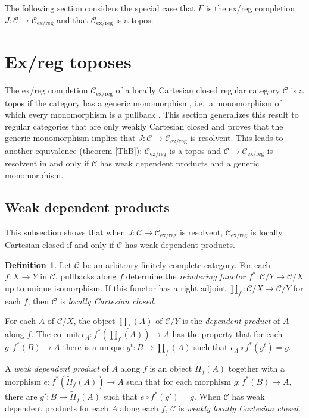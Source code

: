 \documentclass[sort&compress]{elsarticle}
\theoremstyle{plain}
\theoremstyle{definition}
\newtheorem{defin}[theorem]{Definition}
\theoremstyle{remark}
\newcommand\cat\mathcal
\newcommand\exreg{_\mathrm{ex/reg}}
\begin{document}
The following section considers the special case that $F$ is the ex/reg completion $J:\cat C\to\cat C\exreg$ and that $\cat C\exreg$ is a topos.

\section{Ex/reg toposes}
The ex/reg completion $\cat C\exreg$ of a locally Cartesian closed regular category $\cat C$ is a topos if the category has a generic monomorphism, i.e.\ a monomorphism of which every monomorphism is a pullback \citep{Menni00exactcompletions}. This section generalizes this result to regular categories that are only weakly Cartesian closed and proves that the generic monomorphism implies that $J:\cat C\to\cat C\exreg$ is resolvent. This leads to another equivalence (theorem \ref{ThB}): $\cat C\exreg$ is a topos and $\cat C \to \cat C\exreg$ is resolvent in and only if $\cat C$ has weak dependent products and a generic monomorphism.

\subsection{Weak dependent products}
This subsection shows that when $J:\cat C \to \cat C\exreg$ is resolvent, $\cat C\exreg$ is locally Cartesian closed if and only if $\cat C$ has weak dependent products.

\newcommand\weakprod{\widetilde{\Pi}}
\begin{defin} Let $\cat C$ be an arbitrary finitely complete category. For each $f:X\to Y$ in $\cat C$, pullbacks along $f$ determine the \emph{reindexing functor} $f^*:\cat C/Y\to\cat C/X$ up to unique isomorphism. If this functor has a right adjoint $\prod_f:\cat C/X\to\cat C/Y$ for each $f$, then $\cat C$ is \emph{locally Cartesian closed}. 

For each $A$ of $\cat C/X$, the object $\prod_f(A)$ of $\cat C/Y$ is the \emph{dependent product} of $A$ along $f$. The co-unit $\epsilon_A: f^*(\prod_f(A))\to A$ has the property that for each $g:f^*(B) \to A$ there is a unique $g^t:B\to \prod_f(A)$ such that $\epsilon_A\circ f^*(g^t) = g$.

A \emph{weak dependent product} of $A$ along $f$ is an object $\weakprod_f(A)$ together with a morphism $e:f^*(\weakprod_f(A))\to A$ such that for each morphism $g:f^*(B)\to A$, there are $g':B\to \weakprod_f(A)$ such that $e\circ f^*(g') = g$. When $\cat C$ has weak dependent products for each $A$ along each $f$, $\cat C$ is \emph{weakly locally Cartesian closed}.
\end{defin}
\end{document}
